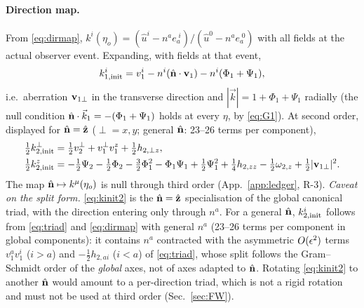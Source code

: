 \paragraph{Direction map.}  From \eqref{eq:dirmap}, $k^i(\eta_o)=(\hat u^i-n^ae_a^{\;i})/(\hat u^0-n^ae_a^{\;0})$ with all
fields at the actual observer event.  Expanding, with fields at that event,
\begin{equation}
k^i_{1,\rm init}=v^i_1-n^i(\hat{\mathbf n}\cdot\mathbf v_1)-n^i(\Phi_1+\Psi_1),
\label{eq:kinit1}
\end{equation}
i.e.\ aberration $\mathbf v_{1\perp}$ in the transverse direction and $|\vec k|=1+\Phi_1+\Psi_1$ radially (the null condition
$\hat{\mathbf n}\cdot\vec k_1=-(\Phi_1+\Psi_1)$ holds at every $\eta$, by \eqref{eq:G1}).  At second order, displayed for $\hat{\mathbf n}=\hat{\mathbf z}$
($\perp=x,y$; general $\hat{\mathbf n}$: 23--26 terms per component),
\begin{align}
\tfrac12k_{2,\rm init}^\perp&=\tfrac12v^\perp_2+v^\perp_1v^z_1+\tfrac12h_{2,\perp z},\nonumber\\
\tfrac12k_{2,\rm init}^z&=-\tfrac12\Psi_2-\tfrac12\Phi_2-\tfrac32\Phi_1^2-\Phi_1\Psi_1+\tfrac12\Psi_1^2+\tfrac14h_{2,zz}-\tfrac12\omega_{2,z}+\tfrac12|\mathbf v_{1\perp}|^2 .
\label{eq:kinit2}
\end{align}
The map $\hat{\mathbf n}\mapsto k^\mu(\eta_o)$ is null through third order (App.~\ref{app:ledger}, R-3).
\emph{Caveat on the split form.}  \eqref{eq:kinit2} is the $\hat{\mathbf n}=\hat{\mathbf z}$ specialisation of the global canonical triad, with the direction
entering only through $n^a$.  For a general $\hat{\mathbf n}$, $k^i_{2,\rm init}$ follows from \eqref{eq:triad} and \eqref{eq:dirmap} with general $n^a$ (23--26
terms per component in global components): it contains $n^a$ contracted with the asymmetric $O(\epsilon^2)$ terms $v^a_1v^i_1$ ($i>a$) and $-\tfrac12h_{2,ai}$
($i<a$) of \eqref{eq:triad}, whose split follows the Gram--Schmidt order of the \emph{global} axes, not of axes adapted to $\hat{\mathbf n}$.  Rotating \eqref{eq:kinit2} to
another $\hat{\mathbf n}$ would amount to a per-direction triad, which is not a rigid rotation and must not be used at third order (Sec.~\ref{sec:FW}).

